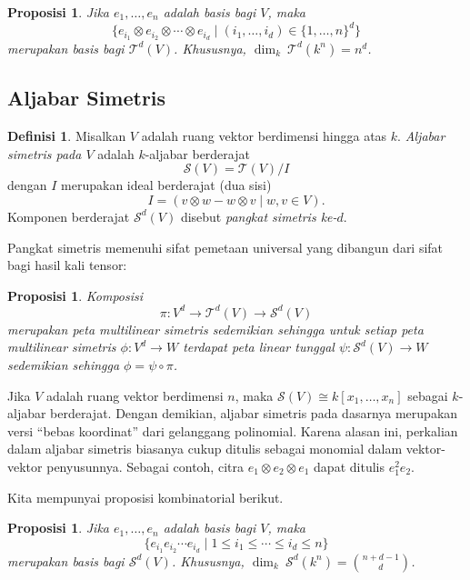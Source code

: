 \documentclass[12pt]{article}
\theoremstyle{plain}
\newtheorem{proposition}[theorem]{Proposisi}
\theoremstyle{definition}
\newtheorem{definition}[theorem]{Definisi}
\theoremstyle{remark}
\numberwithin{equation}{section}
\begin{document}
\begin{proposition}
Jika $e_1, \ldots, e_n$ adalah basis bagi $V$, maka
\[
\{
e_{i_1} \otimes e_{i_2} \otimes \cdots \otimes e_{i_d}
\mid
(i_1,\ldots,i_d) \in \{1,\ldots,n\}^d
\}
\]
merupakan basis bagi $\mathcal{T}^d(V)$.
Khususnya, $\dim_k\ \mathcal{T}^d(k^n)=n^d$.
\end{proposition}

\subsection{Aljabar Simetris}

\begin{definition}
Misalkan $V$ adalah ruang vektor berdimensi hingga atas $k$.
\emph{Aljabar simetris pada $V$} adalah $k$-aljabar berderajat
\[
\mathcal{S}(V) = \mathcal{T}(V)/I
\]
dengan $I$ merupakan ideal berderajat (dua sisi)
\[
I = ( v \otimes w - w \otimes v \mid w,v \in V ).
\]
Komponen berderajat $\mathcal{S}^d(V)$ disebut
\emph{pangkat simetris ke-$d$}.
\end{definition}

Pangkat simetris memenuhi sifat pemetaan universal yang dibangun dari
sifat bagi hasil kali tensor:

\begin{proposition}
Komposisi
\[
\pi : V^d \to \mathcal{T}^d(V) \to \mathcal{S}^d(V)
\]
merupakan peta multilinear simetris sedemikian sehingga untuk setiap
peta multilinear simetris
$\phi : V^d \to W$ terdapat peta linear tunggal
$\psi : \mathcal{S}^d(V) \to W$
sedemikian sehingga
$\phi = \psi \circ \pi$.
\end{proposition}

Jika $V$ adalah ruang vektor berdimensi $n$, maka
$\mathcal{S}(V) \cong k[x_1,\ldots,x_n]$ sebagai $k$-aljabar berderajat.
Dengan demikian, aljabar simetris pada dasarnya merupakan versi “bebas koordinat” dari
gelanggang polinomial.
Karena alasan ini, perkalian dalam aljabar simetris biasanya cukup ditulis
sebagai monomial dalam vektor-vektor penyusunnya.
Sebagai contoh, citra $e_1 \otimes e_2 \otimes e_1$ dapat
ditulis $e_1^2e_2$.

Kita mempunyai proposisi kombinatorial berikut.

\begin{proposition}
Jika $e_1, \ldots, e_n$ adalah basis bagi $V$, maka
\[
\{
e_{i_1}e_{i_2} \cdots e_{i_d}
\mid
1 \le i_1 \le \cdots \le i_d \le n
\}
\]
merupakan basis bagi $\mathcal{S}^d(V)$.
Khususnya, $\dim_k\ \mathcal{S}^d(k^n)=\binom{n+d-1}{d}$.
\end{proposition}
\end{document}

